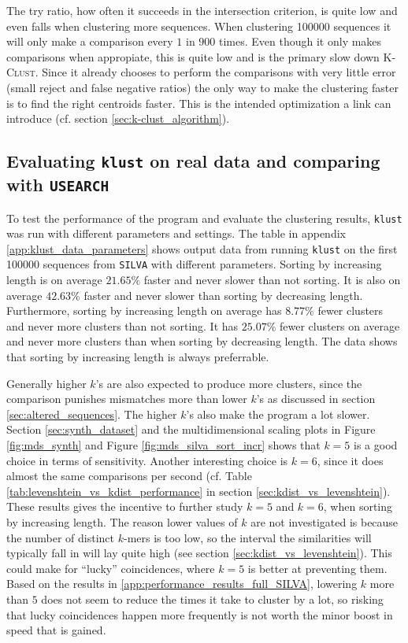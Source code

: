 The try ratio, how often it succeeds in the intersection criterion, is quite
low and even falls when clustering more sequences. When clustering
\num{100000} sequences it will only make a comparison every $1$ in $900$
times. Even though it only makes comparisons when appropiate, this is quite
low and is the primary slow down \textsc{K-Clust}. Since it already chooses to
perform the comparisons with very little error (small reject and false
negative ratios) the only way to make the clustering faster is to find the
right centroids faster. This is the intended optimization a link can introduce
(cf. section \ref{sec:k-clust_algorithm}).


\subsection{Evaluating \texttt{klust} on real data and comparing with
            \texttt{USEARCH}}
\label{sec:evaluating_klust_real_data}

To test the performance of the program and evaluate the clustering results,
\texttt{klust} was run with different parameters and settings. The table in
appendix \ref{app:klust_data_parameters} shows output data from running
\texttt{klust} on the first \num{100000} sequences from \texttt{SILVA} with
different parameters. Sorting by increasing length is on average $21.65\%$
faster and never slower than not sorting. It is also on average $42.63\%$
faster and never slower than sorting by decreasing length. Furthermore,
sorting by increasing length on average has $8.77\%$ fewer clusters and never
more clusters than not sorting. It has $25.07\%$ fewer clusters on average and
never more clusters than when sorting by decreasing length. The data shows
that sorting by increasing length is always preferrable.

Generally higher $k$'s are also expected to produce more clusters, since the
comparison punishes mismatches more than lower $k$'s as discussed in section
\ref{sec:altered_sequences}. The higher $k$'s also make the program a lot
slower. Section \ref{sec:synth_dataset} and the multidimensional scaling plots
in Figure \ref{fig:mds_synth} and Figure \ref{fig:mds_silva_sort_incr} shows
that $k=5$ is a good choice in terms of sensitivity. Another interesting
choice is $k=6$, since it does almost the same comparisons per second (cf.
Table \ref{tab:levenshtein_vs_kdist_performance} in section
\ref{sec:kdist_vs_levenshtein}). These results gives the incentive to further
study $k=5$ and $k=6$, when sorting by increasing length. The reason lower
values of $k$ are not investigated is because the number of distinct $k$-mers
is too low, so the interval the similarities will typically fall in will lay
quite high (see section \ref{sec:kdist_vs_levenshtein}). This could make for
``lucky'' coincidences, where $k=5$ is better at preventing them. Based on the
results in \ref{app:performance_results_full_SILVA}, lowering $k$ more than
$5$ does not seem to reduce the times it take to cluster by a lot, so risking
that lucky coincidences happen more frequently is not worth the minor boost in
speed that is gained.

